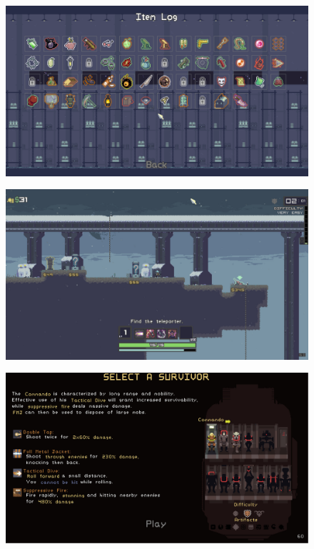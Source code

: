 \begin{figure}[H]
    \centering
    \begin{minipage}{0.40\textwidth}
        \centering
        \includegraphics[width=1.0\textwidth]{Cuerpo/4/RoR1.png} %
        \label{RoR-Objetos}
    \end{minipage}\hfill
    \begin{minipage}{0.40\textwidth}
        \centering
        \includegraphics[width=1.0\textwidth]{Cuerpo/4/RoR2.jpg} %
        \label{RoR-Nivel}
    \end{minipage}
    \centering
    \begin{minipage}{0.40\textwidth}
        \centering
        \includegraphics[width=1.0\textwidth]{Cuerpo/4/RoR3.jpg} %

\end{minipage}
\end{figure}
